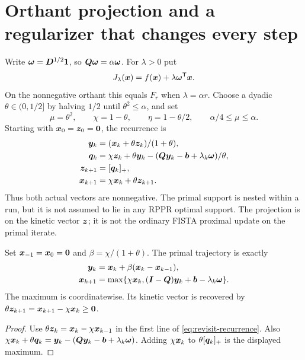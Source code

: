 \section{Orthant projection and a regularizer that changes every step}
Write $\bm{\omega}=\bm{D}^{1/2}\mathbf{1}$, so $\bm{Q}\bm{\omega}=\alpha\bm{\omega}$.
For $\lambda>0$ put
\[
 J_\lambda(\bm{x})=f(\bm{x})+\lambda\bm{\omega}^{\mathsf{T}}\bm{x}.
\]
On the nonnegative orthant this equals $F_r$ when $\lambda=\alpha r$.
Choose a dyadic $\theta\in(0,1/2]$ by halving $1/2$ until
$\theta^2\leq\alpha$, and set
\begin{equation}
 \mu=\theta^2,\qquad \chi=1-\theta,\qquad
 \eta=1-\theta/2,\qquad \alpha/4\leq\mu\leq\alpha.
 \label{eq:revisit-parameters}
\end{equation}
Starting with $\bm{x}_0=\bm{z}_0=\bm{0}$, the recurrence is
\begin{equation}
 \begin{aligned}
 \bm{y}_k&=(\bm{x}_k+\theta\bm{z}_k)/(1+\theta),\\
 \bm{q}_k&=\chi\bm{z}_k+\theta\bm{y}_k
          -(\bm{Q}\bm{y}_k-\bm{b}+\lambda_k\bm{\omega})/\theta,\\
 \bm{z}_{k+1}&=[\bm{q}_k]_+,\\
 \bm{x}_{k+1}&=\chi\bm{x}_k+\theta\bm{z}_{k+1}.
 \end{aligned}
 \label{eq:revisit-recurrence}
\end{equation}
Thus both actual vectors are nonnegative. The primal support is nested
within a run, but it is not assumed to lie in any RPPR optimal support.
The projection is on the kinetic vector $\bm{z}$; it is not the ordinary
FISTA proximal update on the primal iterate.

\begin{proposition}
\label{prop:revisit-floor-form}
Set $\bm{x}_{-1}=\bm{x}_0=\bm{0}$ and
$\beta=\chi/(1+\theta)$. The primal trajectory is exactly
\begin{equation}
 \begin{aligned}
 \bm{y}_k&=\bm{x}_k+\beta(\bm{x}_k-\bm{x}_{k-1}),\\
 \bm{x}_{k+1}&=\max\{\chi\bm{x}_k,
              (\bm{I}-\bm{Q})\bm{y}_k+\bm{b}-\lambda_k\bm{\omega}\}.
 \end{aligned}
 \label{eq:revisit-floor-form}
\end{equation}
The maximum is coordinatewise. Its kinetic vector is recovered by
$\theta\bm{z}_{k+1}=\bm{x}_{k+1}-\chi\bm{x}_k\geq\bm{0}$.
\end{proposition}
\begin{proof}
Use $\theta\bm{z}_k=\bm{x}_k-\chi\bm{x}_{k-1}$ in the first line of
\cref{eq:revisit-recurrence}. Also
$\chi\bm{x}_k+\theta\bm{q}_k
 =\bm{y}_k-(\bm{Q}\bm{y}_k-\bm{b}+\lambda_k\bm{\omega})$.
Adding $\chi\bm{x}_k$ to $\theta[\bm{q}_k]_+$ is the displayed maximum.
\end{proof}

